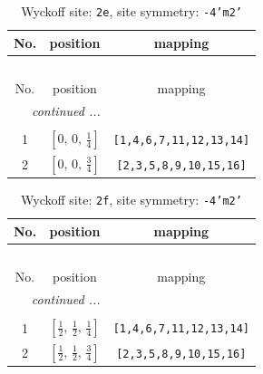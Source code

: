 \documentclass[fleqn,8pt]{jsarticle}
\begin{document}
\begin{longtable}{ccc}
\caption{Wyckoff site: {\tt 2e}, site symmetry: {\tt -4'm2'}}
 \\
 \hline \hline
No. & position & mapping \\ \hline \endfirsthead

\multicolumn{2}{l}{\tablename\ \thetable{}} \\
 \hline \hline
No. & position & mapping \\ \hline \endhead

 \hline \hline
\multicolumn{2}{r}{\footnotesize\it continued ...} \\ \endfoot

 \hline \hline
\multicolumn{2}{r}{} \\ \endlastfoot

1 & $\left[ 0,\, 0,\, \frac{1}{4} \right]$ & {\tt [1,4,6,7,11,12,13,14]} \\ \hline
2 & $\left[ 0,\, 0,\, \frac{3}{4} \right]$ & {\tt [2,3,5,8,9,10,15,16]} \\
\end{longtable}
\renewcommand{\arraystretch}{1.2}
\begin{longtable}{ccc}
\caption{Wyckoff site: {\tt 2f}, site symmetry: {\tt -4'm2'}}
 \\
 \hline \hline
No. & position & mapping \\ \hline \endfirsthead

\multicolumn{2}{l}{\tablename\ \thetable{}} \\
 \hline \hline
No. & position & mapping \\ \hline \endhead

 \hline \hline
\multicolumn{2}{r}{\footnotesize\it continued ...} \\ \endfoot

 \hline \hline
\multicolumn{2}{r}{} \\ \endlastfoot

1 & $\left[ \frac{1}{2},\, \frac{1}{2},\, \frac{1}{4} \right]$ & {\tt [1,4,6,7,11,12,13,14]} \\ \hline
2 & $\left[ \frac{1}{2},\, \frac{1}{2},\, \frac{3}{4} \right]$ & {\tt [2,3,5,8,9,10,15,16]} \\
\end{longtable}
\renewcommand{\arraystretch}{1.2}
\end{document}
